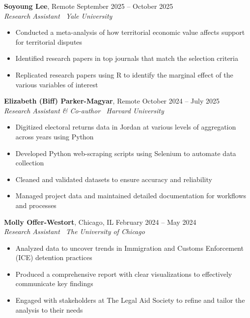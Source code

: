 \documentclass[10pt,a4paper]{article}
\newenvironment{cvitems}{%
  \begin{itemize}%
  \setlength{\itemsep}{1pt}%
  \setlength{\parskip}{0pt}%
  \setlength{\parsep}{0pt}%
  \setlength{\topsep}{1.5pt}%
  \setlength{\partopsep}{0pt}%
  \setlength{\leftmargin}{15pt}%
  \setlength{\labelwidth}{8pt}%
  \setlength{\labelsep}{5pt}%
}{%
  \end{itemize}%
}
\begin{document}
\newpage
\textbf{Soyoung Lee}, Remote \hfill September 2025 -- October 2025\\
\textit{Research Assistant \textbar\ Yale University}
\begin{cvitems}
    \item Conducted a meta-analysis of how territorial economic value affects support for territorial disputes
    \item Identified research papers in top journals that match the selection criteria
    \item Replicated research papers using R to identify the marginal effect of the various variables of interest
\end{cvitems}

\vspace{0.7ex}
\textbf{Elizabeth (Biff) Parker-Magyar}, Remote \hfill October 2024 -- July 2025\\
\textit{Research Assistant \& Co-author \textbar\ Harvard University}
\begin{cvitems}
    \item Digitized electoral returns data in Jordan at various levels of aggregation across years using Python
    \item Developed Python web-scraping scripts using Selenium to automate data collection
    \item Cleaned and validated datasets to ensure accuracy and reliability
    \item Managed project data and maintained detailed documentation for workflows and processes
\end{cvitems}

\vspace{0.7ex}
\textbf{Molly Offer-Westort}, Chicago, IL \hfill February 2024 -- May 2024\\
\textit{Research Assistant \textbar\ The University of Chicago}
\begin{cvitems}
    \item Analyzed data to uncover trends in Immigration and Customs Enforcement (ICE) detention practices
    \item Produced a comprehensive report with clear visualizations to effectively communicate key findings
    \item Engaged with stakeholders at The Legal Aid Society to refine and tailor the analysis to their needs
\end{cvitems}
\end{document}
